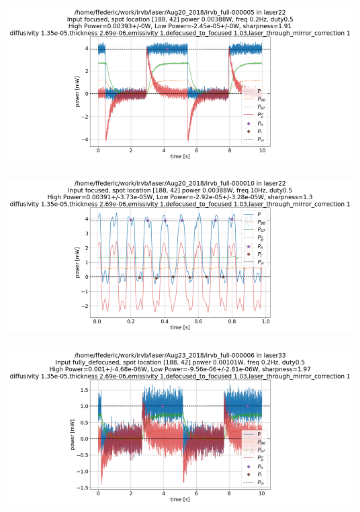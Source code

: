 \begin{figure}[!ht]
     \centering
     \begin{subfigure}{0.6\linewidth}
        \centering
        \includegraphics[width=\textwidth,trim={270 0 320 115},clip]{Chapters/chapter2/figs/example_for_paper_22.png}
        \vspace*{-5mm}
        {\color{white}\caption{\phantom{ }}\label{fig:example_for_paper_15}}
     \end{subfigure}
     \begin{subfigure}{0.6\linewidth}
        \centering
        \includegraphics[width=\textwidth,trim={270 0 320 115},clip]{Chapters/chapter2/figs/example_for_paper_23.png}
        \vspace*{-5mm}
        {\color{white}\caption{\phantom{ }}\label{fig:example_for_paper_14}}
     \end{subfigure}
     \begin{subfigure}{0.62\linewidth}
        \centering
        \includegraphics[width=\textwidth,trim={250 0 320 115},clip]{Chapters/chapter2/figs/example_for_paper_21.png}

\end{subfigure}
\end{figure}
